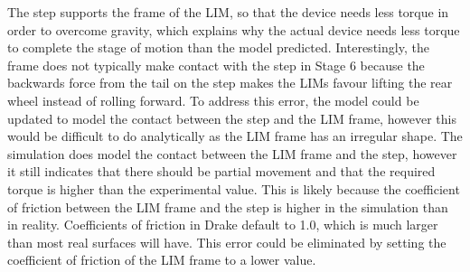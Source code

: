 The step supports the frame of the LIM, so that the device needs less torque in order to overcome gravity, which explains why the actual device needs less torque to complete the stage of motion than the model predicted. Interestingly, the frame does not typically make contact with the step in Stage 6 because the backwards force from the tail on the step makes the LIMs favour lifting the rear wheel instead of rolling forward. To address this error, the model could be updated to model the contact between the step and the LIM frame, however this would be difficult to do analytically as the LIM frame has an irregular shape. The simulation does model the contact between the LIM frame and the step, however it still indicates that there should be partial movement and that the required torque is higher than the experimental value. This is likely because the coefficient of friction between the LIM frame and the step is higher in the simulation than in reality. Coefficients of friction in Drake default to 1.0, which is much larger than most real surfaces will have. This error could be eliminated by setting the coefficient of friction of the LIM frame to a lower value. \\

